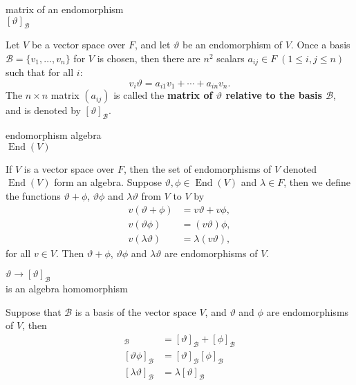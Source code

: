 \documentclass[avery5371,grid]{flashcards}
\newcommand{\B}{\mathscr{B}}
\renewcommand{\le}{\leqslant}
\renewcommand{\theta}{\vartheta}
\DeclareMathOperator{\End}{\ensuremath{\textrm{End}}}
\newcommand{\defn}[1]{\textbf{#1}}
\begin{document}

\begin{flashcard}[Definition]{matrix of an endomorphism \\ $[\theta ]_{\B}$}

  Let $V$ be a vector space over $F$, and let $\theta$ be an
  endomorphism of $V$. Once a basis $\B = \{ v_1, \ldots, v_n \}$ for
  $V$ is chosen, then there are $n^2$ scalars
  $a_{ij} \in F \; (1 \le i,j \le n)$ such that for all $i$:
  \[
    v_i \theta = a_{i1}v_1 + \cdots + a_{in}v_n.
  \]
  The $n\times n$ matrix $(a_{ij})$ is called the \defn{matrix of
    $\theta$ relative to the basis $\B$}, and is denoted by
  $[\theta ]_{\B}$.

\end{flashcard}

\begin{flashcard}[Definition]{endomorphism algebra \\$\End(V)$}

  If $V$ is a vector space over $F$, then the set of endomorphisms of
  $V$ denoted $\End(V)$ form an algebra. Suppose
  $\theta, \phi \in \End(V)$ and $\lambda \in F$, then we
  define the functions $\theta + \phi$, $\theta \phi$ and
  $\lambda \theta$ from $V$ to $V$ by
  \begin{align*}
    v(\theta + \phi) &= v\theta + v\phi, \\
    v(\theta \phi) &= (v \theta) \phi, \\
    v(\lambda \theta) &= \lambda (v \theta),
  \end{align*}
  for all $v \in V$. Then $\theta + \phi$, $\theta \phi$ and
  $\lambda \theta$ are endomorphisms of $V$.

\end{flashcard}

\begin{flashcard}[Theorem]{$\theta \to [\theta]_{\B}$\\ is an algebra homomorphism}

  Suppose that $\B$ is a basis of the vector space $V$, and $\theta$
  and $\phi$ are endomorphisms of $V$, then
  \begin{align*}
    [\theta + \phi]_{\B} &= [\theta]_{\B} + [\phi]_{\B} \\
    [\theta \phi]_{\B} &= [\theta]_{\B} [\phi]_{\B} \\
    [\lambda \theta]_{\B} &= \lambda[\theta]_{\B}
  \end{align*}

\end{flashcard}
\end{document}
